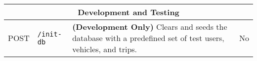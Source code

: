 \begin{longtable}{|p{}|p{}|p{}|p{}|}
    \multicolumn{4}{|c|}{\textbf{Development and Testing}} \\
    \hline
    POST & \texttt{/init-db} & \textbf{(Development Only)} Clears and seeds the database with a predefined set of test users, vehicles, and trips. & No \\
    \hline

\end{longtable}
